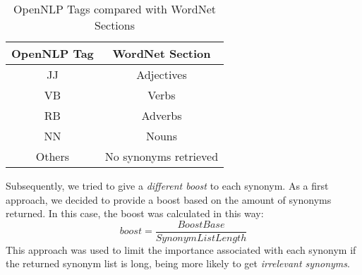 \begin{table}[h]
    \caption{OpenNLP Tags compared with WordNet Sections}
    \label{tab:opennlp-tags}
    \centering
    \begin{tabular}{|c|c|}
        \toprule
        \textbf{OpenNLP Tag} & \textbf{WordNet Section}\\
        \midrule
        JJ & Adjectives\\
        
        VB & Verbs\\
        
        RB & Adverbs\\
        
        NN & Nouns\\
        
        Others & No synonyms retrieved\\
        \bottomrule
    \end{tabular}
\end{table}

Subsequently, we tried to give a \emph{different boost} to each synonym. As a first approach, we decided to provide a boost based on the amount of synonyms returned. In this case, the boost was calculated in this way: 
\begin{equation}
boost=\frac{Boost Base}{Synonym List Length}
\end{equation}
This approach was used to limit the importance associated with each synonym if the returned synonym list is long, being more likely to get \emph{irrelevant synonyms}. \\

